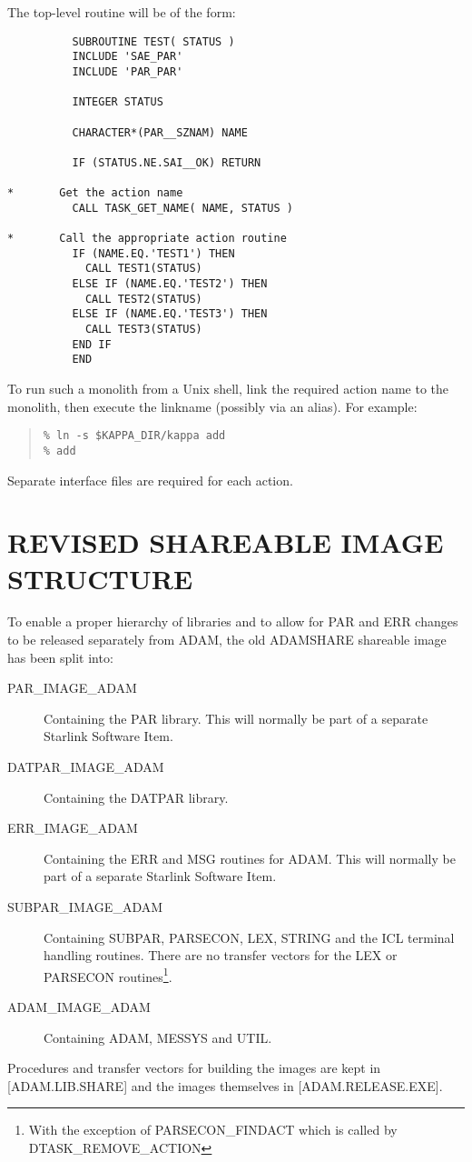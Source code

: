 The top-level routine will be of the form:
\begin{small}
\begin{verbatim}
          SUBROUTINE TEST( STATUS )
          INCLUDE 'SAE_PAR'
          INCLUDE 'PAR_PAR'

          INTEGER STATUS

          CHARACTER*(PAR__SZNAM) NAME

          IF (STATUS.NE.SAI__OK) RETURN

*       Get the action name
          CALL TASK_GET_NAME( NAME, STATUS )

*       Call the appropriate action routine
          IF (NAME.EQ.'TEST1') THEN
            CALL TEST1(STATUS)
          ELSE IF (NAME.EQ.'TEST2') THEN
            CALL TEST2(STATUS)
          ELSE IF (NAME.EQ.'TEST3') THEN
            CALL TEST3(STATUS)
          END IF
          END
\end{verbatim}
\end{small}

To run such a monolith from a Unix shell, link the required action name to the
monolith, then execute the linkname (possibly via an alias). For example:

\begin{quote} \begin{verbatim}
% ln -s $KAPPA_DIR/kappa add
% add
\end{verbatim} \end{quote}

Separate interface files are required for each action.

\section{REVISED SHAREABLE IMAGE STRUCTURE}
\label{shares}
To enable a proper hierarchy of libraries and to allow for PAR and ERR changes
to be released separately from ADAM, the old ADAMSHARE shareable image has been
split into:
\begin{description}
\item[PAR\_IMAGE\_ADAM] Containing the PAR library. This will normally be part
of a separate Starlink Software Item.
\item[DATPAR\_IMAGE\_ADAM] Containing the DATPAR library.
\item[ERR\_IMAGE\_ADAM] Containing the ERR and MSG routines for ADAM.
This will normally be part of a separate Starlink Software Item.
\item[SUBPAR\_IMAGE\_ADAM] Containing SUBPAR, PARSECON, LEX, STRING and the ICL
terminal handling routines. There are no transfer vectors for the LEX or
PARSECON routines\footnote{With the exception of PARSECON\_FINDACT which is
called by DTASK\_REMOVE\_ACTION}.
\item[ADAM\_IMAGE\_ADAM] Containing ADAM, MESSYS and UTIL.
\end{description}
Procedures and transfer vectors for building the images are kept in 
[ADAM.LIB.SHARE] and the images themselves in [ADAM.RELEASE.EXE].

